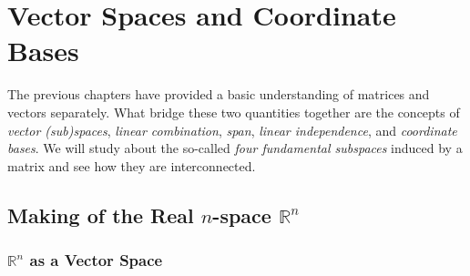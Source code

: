\chapter{Vector Spaces and Coordinate Bases}
\label{chap:vec_space}

The previous chapters have provided a basic understanding of matrices and vectors separately. What bridge these two quantities together are the concepts of \textit{vector (sub)spaces}, \textit{linear combination}, \textit{span}, \textit{linear independence}, and \textit{coordinate bases}. We will study about the so-called \textit{four fundamental subspaces} induced by a matrix and see how they are interconnected. 

\section{Making of the Real $n$-space $\mathbb{R}^n$}

\subsection{$\mathbb{R}^n$ as a Vector Space}

